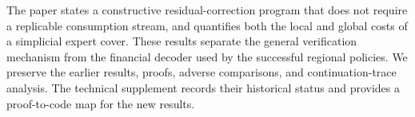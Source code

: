 The paper states a constructive residual-correction program that does not require a replicable consumption stream, and quantifies both the local and global costs of a simplicial expert cover. These results separate the general verification mechanism from the financial decoder used by the successful regional policies. We preserve the earlier results, proofs, adverse comparisons, and continuation-trace analysis. The technical supplement records their historical status and provides a proof-to-code map for the new results.
